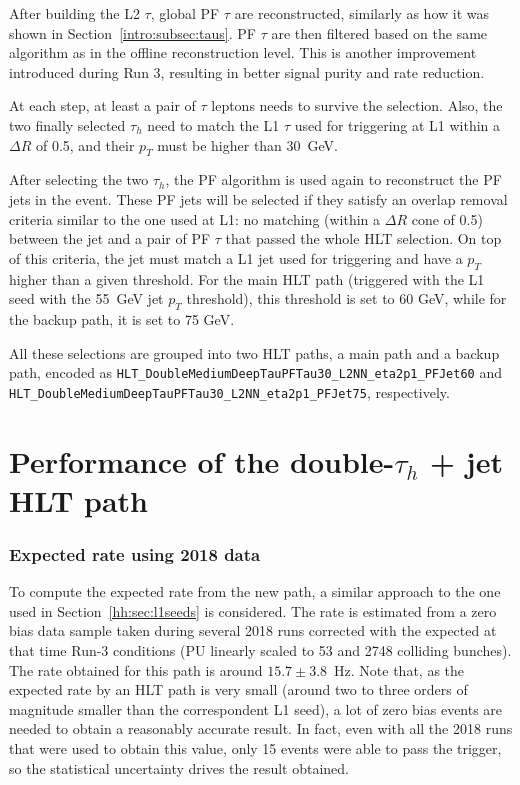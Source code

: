 \documentclass[../main.tex]{subfiles}
\begin{document}
After building the L2 $\tau$, global PF $\tau$ are reconstructed, similarly as how it was shown in Section~\ref{intro:subsec:taus}. PF $\tau$ are then filtered based on the same \deeptau{} algorithm as in the offline reconstruction level. This is another improvement introduced during Run 3, resulting in better signal purity and rate reduction.

At each step, at least a pair of $\tau$ leptons needs to survive the selection. Also, the two finally selected $\tau_h$ need to match the L1 $\tau$ used for triggering at L1 within a $\Delta R$ of 0.5, and their $p_T$ must be higher than 30~GeV.

After selecting the two $\tau_h$, the PF algorithm is used again to reconstruct the PF jets in the event. These PF jets will be selected if they satisfy an overlap removal criteria similar to the one used at L1: no matching (within a $\Delta R$ cone of 0.5) between the jet and a pair of PF $\tau$ that passed the whole HLT selection. On top of this criteria, the jet must match a L1 jet used for triggering and have a $p_T$ higher than a given threshold. For the main HLT path (triggered with the L1 seed with the 55~GeV jet $p_T$ threshold), this threshold is set to 60 GeV, while for the backup path, it is set to 75 GeV.

All these selections are grouped into two HLT paths, a main path and a backup path, encoded as \texttt{HLT\_Double\-MediumDeepTauPFTau30\_L2NN\_eta2p1\_PFJet60} and\\\texttt{HLT\-\_Double\-MediumDeepTau\-PF\-Tau30\-\_L2NN\_eta2p1\_PFJet75}, respectively.

\section{Performance of the double-$\tau_h$ + jet HLT path}
\label{hh:sec:hlt_performance}

\subsubsection{Expected rate using 2018 data}

To compute the expected rate from the new path, a similar approach to the one used in Section~\ref{hh:sec:l1seeds} is considered. The rate is estimated from a zero bias data sample taken during several 2018 runs corrected with the expected at that time Run-3 conditions (PU linearly scaled to 53 and 2748 colliding bunches). The rate obtained for this path is around $15.7\pm3.8$~Hz. Note that, as the expected rate by an HLT path is very small (around two to three orders of magnitude smaller than the correspondent L1 seed), a lot of zero bias events are needed to obtain a reasonably accurate result. In fact, even with all the 2018 runs that were used to obtain this value, only 15 events were able to pass the trigger, so the statistical uncertainty drives the result obtained.
\end{document}
